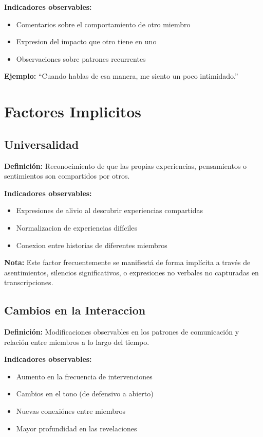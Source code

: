 \documentclass[12pt,a4paper,twoside]{book}
\begin{document}
\textbf{Indicadores observables:}
\begin{itemize}
    \item Comentarios sobre el comportamiento de otro miembro
    \item Expresion del impacto que otro tiene en uno
    \item Observaciones sobre patrones recurrentes
\end{itemize}

\textbf{Ejemplo:} ``Cuando hablas de esa manera, me siento un poco intimidado.''

\section{Factores Implicitos}

\subsection{Universalidad}

\textbf{Definición:} Reconocimiento de que las propias experiencias, pensamientos o sentimientos son compartidos por otros.

\textbf{Indicadores observables:}
\begin{itemize}
    \item Expresiones de alivio al descubrir experiencias compartidas
    \item Normalizacion de experiencias difíciles
    \item Conexion entre historias de diferentes miembros
\end{itemize}

\textbf{Nota:} Este factor frecuentemente se manifiestá de forma implícita a través de asentimientos, silencios significativos, o expresiones no verbales no capturadas en transcripciones.

\subsection{Cambios en la Interaccion}

\textbf{Definición:} Modificaciones observables en los patrones de comunicación y relación entre miembros a lo largo del tiempo.

\textbf{Indicadores observables:}
\begin{itemize}
    \item Aumento en la frecuencia de intervenciones
    \item Cambios en el tono (de defensivo a abierto)
    \item Nuevas conexiónes entre miembros
    \item Mayor profundidad en las revelaciones
\end{itemize}
\end{document}
